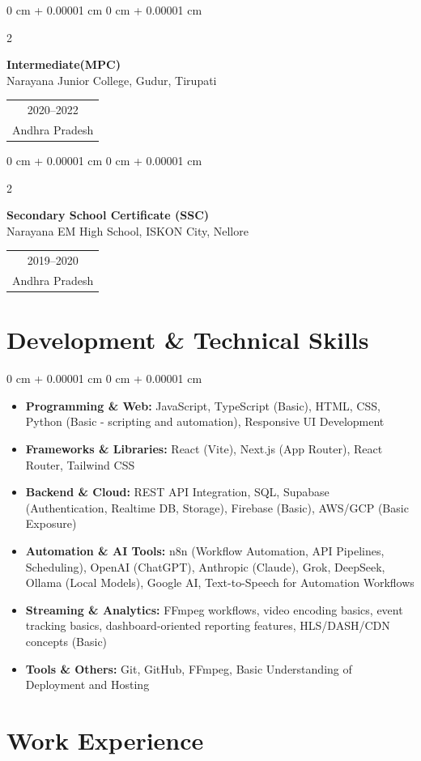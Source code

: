\documentclass[10pt, a4paper]{article}
\makeatletter
\newenvironment{highlights}{
    \begin{itemize}[
        topsep=0.06 cm,
        parsep=0.04 cm,
        partopsep=0pt,
        itemsep=0.02 cm,
        leftmargin=0 cm + 10pt
    ]
}{
    \end{itemize}
}
\newenvironment{onecolentry}{
    \begin{adjustwidth}{
        0 cm + 0.00001 cm
    }{
        0 cm + 0.00001 cm
    }
}{
    \end{adjustwidth}
}
\newenvironment{twocolentry}[2][4.5 cm]{
    \onecolentry
    \def\secondColumn{#2}
    \setcolumnwidth{\fill, #1}
    \begin{paracol}{2}
}{
    \switchcolumn \raggedleft \secondColumn
    \end{paracol}
    \endonecolentry
}
\newcommand{\eduDateBlock}[2]{
    \begin{tabular}[t]{@{}c@{}}
        \normalsize #1 \\
        \normalsize #2
    \end{tabular}
}
\makeatother
\begin{document}
    \vspace{0.10 cm}
    \begin{twocolentry}{
        \eduDateBlock{2020--2022}{Andhra Pradesh}
    }
        \textbf{Intermediate(MPC)}\\
        Narayana Junior College, Gudur, Tirupati
    \end{twocolentry}

    \vspace{0.10 cm}
    \begin{twocolentry}{
        \eduDateBlock{2019--2020}{Andhra Pradesh}
    }
        \textbf{Secondary School Certificate (SSC)}\\
        Narayana EM High School, ISKON City, Nellore
    \end{twocolentry}

    \section{Development \& Technical Skills}

    \begin{onecolentry}
        \begin{highlights}
            \item \textbf{Programming \& Web:} JavaScript, TypeScript (Basic), HTML, CSS, Python (Basic - scripting and automation), Responsive UI Development
            \item \textbf{Frameworks \& Libraries:} React (Vite), Next.js (App Router), React Router, Tailwind CSS
            \item \textbf{Backend \& Cloud:} REST API Integration, SQL, Supabase (Authentication, Realtime DB, Storage), Firebase (Basic), AWS/GCP (Basic Exposure)
            \item \textbf{Automation \& AI Tools:} n8n (Workflow Automation, API Pipelines, Scheduling), OpenAI (ChatGPT), Anthropic (Claude), Grok, DeepSeek, Ollama (Local Models), Google AI, Text-to-Speech for Automation Workflows
            \item \textbf{Streaming \& Analytics:} FFmpeg workflows, video encoding basics, event tracking basics, dashboard-oriented reporting features, HLS/DASH/CDN concepts (Basic)
            \item \textbf{Tools \& Others:} Git, GitHub, FFmpeg, Basic Understanding of Deployment and Hosting
        \end{highlights}
    \end{onecolentry}

    \section{Work Experience}
\end{document}
